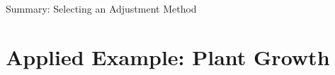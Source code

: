 \begin{frame}[allowframebreaks]{Summary: Selecting an Adjustment Method}

\end{frame}

\section{Applied Example: Plant Growth}

